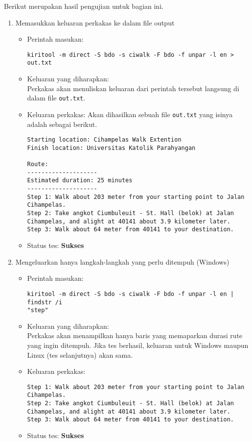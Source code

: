 Berikut merupakan hasil pengujian untuk bagian ini.
\begin{enumerate}	
	\item Memasukkan keluaran perkakas ke dalam file output
	\begin{itemize}
		\item Perintah masukan:
		\begin{verbatim}
kiritool -m direct -S bdo -s ciwalk -F bdo -f unpar -l en > out.txt
		\end{verbatim}
		\item Keluaran yang diharapkan: \\
		Perkakas akan menuliskan keluaran dari perintah tersebut langsung di dalam file \verb|out.txt|.
		\item Keluaran perkakas: Akan dihasilkan sebuah file \verb|out.txt| yang isinya adalah sebagai berikut.
		\begin{lstlisting}
Starting location: Cihampelas Walk Extention
Finish location: Universitas Katolik Parahyangan

Route:
--------------------
Estimated duration: 25 minutes
--------------------
Step 1: Walk about 203 meter from your starting point to Jalan Cihampelas.
Step 2: Take angkot Ciumbuleuit - St. Hall (belok) at Jalan Cihampelas, and alight at 40141 about 3.9 kilometer later.
Step 3: Walk about 64 meter from 40141 to your destination.
		\end{lstlisting}
		\item Status tes: \textbf{Sukses}
	\end{itemize}
	
	\item Mengeluarkan hanya langkah-langkah yang perlu ditempuh (Windows)
	\begin{itemize}
		\item Perintah masukan:
		\begin{verbatim}
kiritool -m direct -S bdo -s ciwalk -F bdo -f unpar -l en | findstr /i
"step"
		\end{verbatim}
		\item Keluaran yang diharapkan: \\
		Perkakas akan menampilkan hanya baris yang memaparkan durasi rute yang ingin ditempuh. Jika tes berhasil, keluaran untuk Windows maupun Linux (tes selanjutnya) akan sama.
		\item Keluaran perkakas:
		\begin{lstlisting}
Step 1: Walk about 203 meter from your starting point to Jalan Cihampelas.
Step 2: Take angkot Ciumbuleuit - St. Hall (belok) at Jalan Cihampelas, and alight at 40141 about 3.9 kilometer later.
Step 3: Walk about 64 meter from 40141 to your destination.
		\end{lstlisting}
		\item Status tes: \textbf{Sukses}
	\end{itemize}
	

\end{enumerate}
